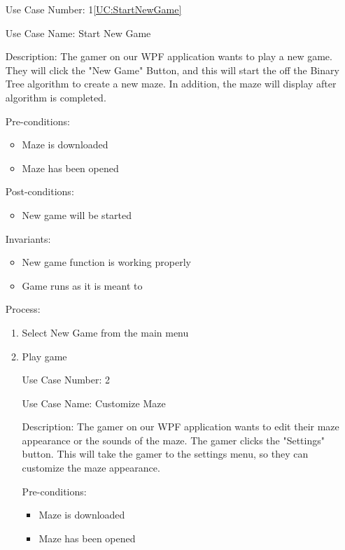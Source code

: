 \documentclass[10pt,conference,onecolumn,compsoc]{IEEEtran}
\begin{document}
\begin{itemize}
\item[Use Case Number:] 1\ref{UC:StartNewGame}
\item[Use Case Name:] Start New Game 
\item[Description:] The gamer on our WPF application wants to play a new game. They will click the "New Game" Button, and this will start the off the Binary Tree algorithm to create a new maze. In addition, the maze will display after algorithm is completed. 
\item[Pre-conditions:]
\begin{itemize} 
\item Maze is downloaded
\item Maze has been opened
\end{itemize}

\item[Post-conditions:]
\begin{itemize} 
\item New game will be started
\end{itemize}
\item[Invariants:]
\begin{itemize} 
\item New game function is working properly
\item Game runs as it is meant to
\end{itemize}

\item[Process:]
\begin{enumerate}
\item Select New Game from the main menu
\item Play game
\end{enumerate}

\begin{itemize}
\item[Use Case Number:] 2
\item[Use Case Name:] Customize Maze
\item[Description:] The gamer on our WPF application wants to edit their maze appearance or the sounds of the maze. The gamer clicks the "Settings" button. This will take the gamer to the settings menu, so they can customize the maze appearance.

\item[Pre-conditions:]
\begin{itemize} 
\item Maze is downloaded
\item Maze has been opened
\end{itemize}


\end{itemize}
\end{itemize}
\end{document}
